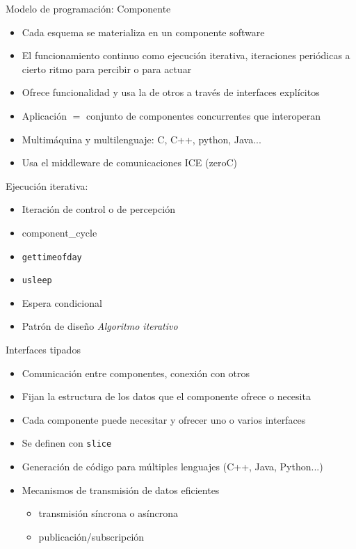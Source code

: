 \documentclass[twocolumn]{svjour3}          %
\begin{document}
Modelo de programación: Componente
\begin{itemize}
\item Cada esquema se materializa en un {componente} software 
\item El funcionamiento continuo como {ejecución iterativa}, iteraciones periódicas a cierto ritmo para percibir o para actuar
\item Ofrece funcionalidad y usa la de otros a través de {interfaces} explícitos
\item Aplicación $=$ conjunto de componentes concurrentes que interoperan
\item {Multimáquina} y {multilenguaje}: C, C++, python, Java... 
\item Usa el middleware de comunicaciones ICE (zeroC)
\end{itemize}

Ejecución iterativa:
\begin{itemize}
\item Iteración de control o de percepción
\item component\_cycle 
\item \texttt{gettimeofday}
\item \texttt{usleep}
\item Espera condicional
\item Patrón de diseño \textit{Algoritmo iterativo}
\end{itemize}

Interfaces tipados
\begin{itemize}
\item {Comunicación entre componentes}, conexión con otros 
\item Fijan la estructura de los datos que el componente ofrece o necesita
\item Cada componente puede necesitar y ofrecer uno o varios interfaces 
\item Se definen con \texttt{slice}
\item Generación de código para múltiples lenguajes (C++, Java, Python...)
\item Mecanismos de transmisión de datos eficientes
\begin{itemize}
\item transmisión síncrona o asíncrona
\item publicación/subscripción
\end{itemize}
\end{itemize}
\end{document}
